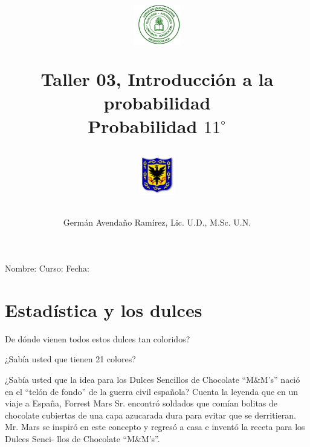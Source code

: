 \documentclass[10pt,twoside]{article}
\author{Germ\'an Avenda\~no Ram\'irez, Lic. U.D., M.Sc. U.N.}
\title{\begin{minipage}{.2\textwidth}
\includegraphics[height=1.75cm]{Images/logo-colegio.png}\end{minipage}
\begin{minipage}{.55\textwidth}
\begin{center}
Taller 03, Introducción a la probabilidad\\
Probabilidad $11^{\circ}$
\end{center}
\end{minipage}\hfill
\begin{minipage}{.2\textwidth}
\includegraphics[height=1.75cm]{Images/logo-sed.png} 
\end{minipage}}
\date{}
\begin{document}
\maketitle
Nombre: \hrulefill Curso: \underline{\hspace*{44pt}} Fecha: \underline{\hspace*{2.5cm}}
\section*{Estad\'istica y los dulces}
De dónde vienen todos estos dulces tan coloridos?

¿Sabía usted que tienen 21 colores?

¿Sabía usted que la idea para los Dulces Sencillos de Chocolate “M\&M’s” nació
en el “telón de fondo” de la guerra civil española? Cuenta la leyenda que en un
viaje a España, Forrest Mars Sr. encontró soldados que comían bolitas de chocolate
cubiertas de una capa azucarada dura para evitar que se derritieran. Mr. Mars se
inspiró en este concepto y regresó a casa e inventó la receta para los Dulces Senci-
llos de Chocolate “M\&M’s”.
\end{document}
